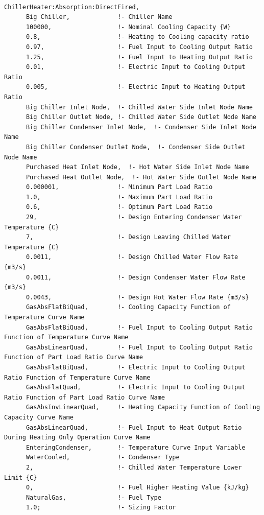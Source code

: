 \begin{lstlisting}

ChillerHeater:Absorption:DirectFired,
      Big Chiller,             !- Chiller Name
      100000,                  !- Nominal Cooling Capacity {W}
      0.8,                     !- Heating to Cooling capacity ratio
      0.97,                    !- Fuel Input to Cooling Output Ratio
      1.25,                    !- Fuel Input to Heating Output Ratio
      0.01,                    !- Electric Input to Cooling Output Ratio
      0.005,                   !- Electric Input to Heating Output Ratio
      Big Chiller Inlet Node,  !- Chilled Water Side Inlet Node Name
      Big Chiller Outlet Node, !- Chilled Water Side Outlet Node Name
      Big Chiller Condenser Inlet Node,  !- Condenser Side Inlet Node Name
      Big Chiller Condenser Outlet Node,  !- Condenser Side Outlet Node Name
      Purchased Heat Inlet Node,  !- Hot Water Side Inlet Node Name
      Purchased Heat Outlet Node,  !- Hot Water Side Outlet Node Name
      0.000001,                !- Minimum Part Load Ratio
      1.0,                     !- Maximum Part Load Ratio
      0.6,                     !- Optimum Part Load Ratio
      29,                      !- Design Entering Condenser Water Temperature {C}
      7,                       !- Design Leaving Chilled Water Temperature {C}
      0.0011,                  !- Design Chilled Water Flow Rate {m3/s}
      0.0011,                  !- Design Condenser Water Flow Rate {m3/s}
      0.0043,                  !- Design Hot Water Flow Rate {m3/s}
      GasAbsFlatBiQuad,        !- Cooling Capacity Function of Temperature Curve Name
      GasAbsFlatBiQuad,        !- Fuel Input to Cooling Output Ratio Function of Temperature Curve Name
      GasAbsLinearQuad,        !- Fuel Input to Cooling Output Ratio Function of Part Load Ratio Curve Name
      GasAbsFlatBiQuad,        !- Electric Input to Cooling Output Ratio Function of Temperature Curve Name
      GasAbsFlatQuad,          !- Electric Input to Cooling Output Ratio Function of Part Load Ratio Curve Name
      GasAbsInvLinearQuad,     !- Heating Capacity Function of Cooling Capacity Curve Name
      GasAbsLinearQuad,        !- Fuel Input to Heat Output Ratio During Heating Only Operation Curve Name
      EnteringCondenser,       !- Temperature Curve Input Variable
      WaterCooled,             !- Condenser Type
      2,                       !- Chilled Water Temperature Lower Limit {C}
      0,                       !- Fuel Higher Heating Value {kJ/kg}
      NaturalGas,              !- Fuel Type
      1.0;                     !- Sizing Factor
\end{lstlisting}

